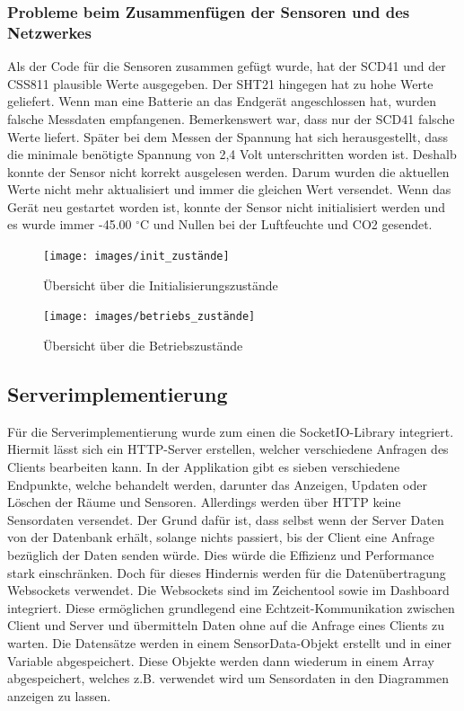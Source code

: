 \documentclass[]{article}
\begin{document}
			 
			\subsubsection{Probleme beim Zusammenfügen der Sensoren und des Netzwerkes}
			Als der Code für die Sensoren zusammen gefügt wurde, hat der SCD41 und der CSS811 plausible Werte ausgegeben. Der SHT21 hingegen hat zu hohe Werte geliefert. Wenn man eine Batterie an das Endgerät angeschlossen hat, wurden falsche Messdaten empfangenen. Bemerkenswert war, dass nur der SCD41 falsche Werte liefert. Später bei dem Messen der Spannung hat sich herausgestellt, dass die minimale benötigte Spannung von 2,4 Volt unterschritten worden ist. Deshalb konnte der Sensor nicht korrekt ausgelesen werden. Darum wurden die aktuellen Werte nicht mehr aktualisiert und immer die gleichen Wert versendet. Wenn das Gerät neu gestartet worden ist, konnte der Sensor nicht initialisiert werden und es wurde immer -45.00 $^\circ$C und Nullen bei der Luftfeuchte und CO2 gesendet.
			
			\begin{figure}[!h]
				\centering
				\texttt{[image: images/init\_zustände]}
				\caption{Übersicht über die Initialisierungszustände}
				\label{img:init_zustände}
			\end{figure}
			\clearpage
			\begin{figure}[!h]
				\centering
				\texttt{[image: images/betriebs\_zustände]}
				\caption{Übersicht über die Betriebszustände}
				\label{img:betriebs_zustände}
			\end{figure}
			\clearpage
			
					
			\subsection{Serverimplementierung}
				Für die Serverimplementierung wurde zum einen die SocketIO-Library integriert. Hiermit lässt sich ein HTTP-Server erstellen, welcher verschiedene Anfragen des Clients bearbeiten kann. In der Applikation gibt es sieben verschiedene Endpunkte, welche behandelt werden, darunter das Anzeigen, Updaten oder Löschen der Räume und Sensoren. Allerdings werden über HTTP keine Sensordaten versendet. Der Grund dafür ist, dass selbst wenn der Server Daten von der Datenbank erhält, solange nichts passiert, bis der Client eine Anfrage bezüglich der Daten senden würde. Dies würde die Effizienz und Performance stark einschränken. \newline 
				Doch für dieses Hindernis werden für die Datenübertragung Websockets verwendet. Die Websockets sind im Zeichentool sowie im Dashboard integriert. Diese ermöglichen grundlegend eine Echtzeit-Kommunikation zwischen Client und Server und übermitteln Daten ohne auf die Anfrage eines Clients zu warten. Die Datensätze werden in einem SensorData-Objekt erstellt und in einer Variable abgespeichert. Diese Objekte werden dann wiederum in einem Array abgespeichert, welches z.B. verwendet wird um Sensordaten in den Diagrammen anzeigen zu lassen. 
				
\end{document}

